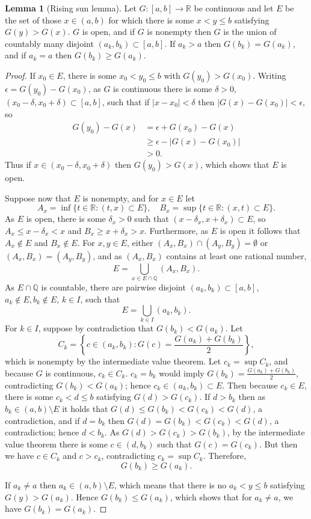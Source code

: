 \documentclass{article}
\theoremstyle{definition}
\newtheorem{lemma}[theorem]{Lemma}
\theoremstyle{definition}
\begin{document}
\begin{lemma}[Rising sun lemma]
Let $G:[a,b] \to \mathbb{R}$ be continuous and let $E$ be the set of those $x \in (a,b)$ for which there is some
$x<y \leq b$ satisfying $G(y)>G(x)$. $G$ is open, and if $G$ is nonempty then $G$ is the union of countably many disjoint 
$(a_k,b_k) \subset [a,b]$. If $a_k>a$ then $G(b_k)=G(a_k)$, and if $a_k=a$ then $G(b_k) \geq G(a_k)$.   
\end{lemma}
\begin{proof}
If $x_0 \in E$, there is some $x_0<y_0 \leq b$ with $G(y_0)>G(x_0)$.
Writing $\epsilon=G(y_0)-G(x_0)$,  as $G$ is continuous there is some
$\delta>0$,
$(x_0-\delta,x_0+\delta) \subset [a,b]$,
 such that if $|x-x_0|<\delta$ then $|G(x)-G(x_0)| < \epsilon$, so
\begin{align*}
G(y_0)-G(x)&=\epsilon+G(x_0)-G(x)\\
&\geq \epsilon - |G(x)-G(x_0)|\\
&>0.
\end{align*}
Thus if $x \in (x_0-\delta,x_0+\delta)$ then $G(y_0)>G(x)$, which shows that $E$ is open.

Suppose now that $E$ is nonempty, and for $x \in E$ let
\[
A_x = \inf\{ t \in \mathbb{R}: (t,x) \subset E\},\quad
B_x = \sup\{ t \in \mathbb{R}: (x,t) \subset E\}.
\]
As $E$ is open, there is some $\delta_x>0$ such that $(x-\delta_x,x+\delta_x) \subset E$,
so $A_x \leq x-\delta_x<x$ and $B_x \geq x+\delta_x>x$. 
Furthermore, as $E$ is open it follows that $A_x \not \in E$ and $B_x \not \in E$. 
For $x,y \in E$, either $(A_x,B_x) \cap (A_y,B_y) =  \emptyset$ or $(A_x,B_x)=(A_y,B_y)$, and as $(A_x,B_x)$ contains
at least one rational number,
\[
E = \bigcup_{x \in E \cap \mathbb{Q}} (A_x,B_x).
\]
As $E \cap \mathbb{Q}$ is countable, there are pairwise disjoint $(a_k,b_k) \subset [a,b]$, $a_k \not \in E, b_k \not \in E$, $k \in I$, such that
\[
E = \bigcup_{k \in I} (a_k,b_k).
\] 
For $k \in I$, suppose by contradiction that $G(b_k)<G(a_k)$. Let
\[
C_k=\left\{c \in (a_k,b_k) : G(c) = \frac{G(a_k)+G(b_k)}{2}\right\},
\]
which is nonempty by the intermediate value theorem.
 Let $c_k = \sup C_k$,
 and  because $G$ is continuous, $c_k \in C_k$. 
$c_k = b_k$ would imply $G(b_k) = \frac{G(a_k)+G(b_k)}{2}$, contradicting  $G(b_k)<G(a_k)$; hence
$c_k \in (a_k,b_k) \subset  E$. 
Then because $c_k \in E$, there is some $c_k<d \leq b$ satisfying $G(d)>G(c_k)$. If $d>b_k$ then as
$b_k \in (a,b) \setminus E$ it holds that $G(d) \leq G(b_k)<G(c_k)<G(d)$, a contradiction, and if $d = b_k$ then
$G(d) = G(b_k) < G(c_k) < G(d)$, a contradiction; hence 
$d < b_k$. As $G(d)>G(c_k)>G(b_k)$, by the intermediate value theorem there is some
$c \in (d,b_k)$ such that $G(c)=G(c_k)$. But then we have $c \in C_k$ and $c>c_k$, contradicting
$c_k = \sup C_k$. Therefore, 
\[
G(b_k) \geq G(a_k).
\]

If $a_k \neq a$ then $a_k \in (a,b) \setminus E$, which means that there is no $a_k<y \leq b$ satisfying
$G(y)>G(a_k)$. Hence $G(b_k) \leq G(a_k)$, which shows that for $a_k \neq a$, we have
$G(b_k)=G(a_k)$. 
\end{proof}
\end{document}
